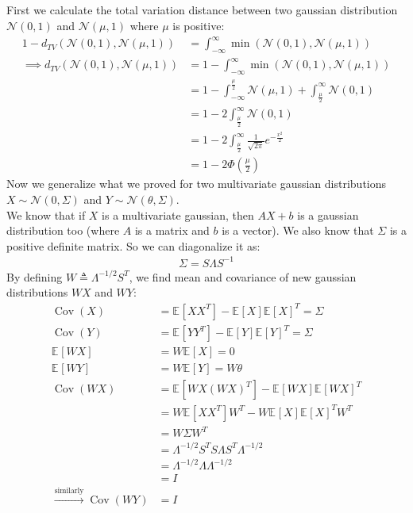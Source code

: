 \documentclass{article}
\numberwithin{equation}{section}
\newcommand{\EX}[2][]{\mathbb{E}_{#1}\left[#2\right]}%
\newcommand{\transpose}{^T}
\DeclareMathOperator*{\covariance}{Cov}
\newcommand{\Cov}[1]{\covariance\left(#1\right)}
\begin{document}
\subsection{}
First we calculate the total variation distance between two gaussian distribution \(\mathcal{N}(0, 1)\) and \(\mathcal{N}(\mu, 1)\) where \(\mu\) is positive:
\begin{align}
1 - d_{TV}(\mathcal{N}(0, 1), \mathcal{N}(\mu, 1)) &= \int_{-\infty}^{\infty} \min(\mathcal{N}(0, 1), \mathcal{N}(\mu, 1))\\
\implies d_{TV}(\mathcal{N}(0, 1), \mathcal{N}(\mu, 1)) &= 1 - \int_{-\infty}^{\infty} \min(\mathcal{N}(0, 1), \mathcal{N}(\mu, 1))\\
&= 1 - \int_{-\infty}^{\frac{\mu}{2}} \mathcal{N}(\mu, 1) + \int_{\frac{\mu}{2}}^{\infty} \mathcal{N}(0, 1)\\
&= 1 - 2 \int_{\frac{\mu}{2}}^{\infty} \mathcal{N}(0, 1)\\
&= 1 - 2 \int_{\frac{\mu}{2}}^{\infty} \frac{1}{\sqrt{2\pi}} e^{-\frac{x^2}{2}}\\
&= 1 - 2 \Phi(\frac{\mu}{2})
\end{align}
Now we generalize what we proved for two multivariate gaussian distributions \(X\sim \mathcal{N}(0, \Sigma)\) and \(Y\sim \mathcal{N}(\theta, \Sigma)\).\\
We know that if \(X\) is a multivariate gaussian, then \(AX + b\) is a gaussian distribution too (where \(A\) is a matrix and \(b\) is a vector).
We also know that \(\Sigma\) is a positive definite matrix.
So we can diagonalize it as:
\begin{align}
\Sigma = S \Lambda S^{-1}
\end{align}
By defining \(W\triangleq \Lambda^{-1/2} S\transpose\), we find mean and covariance of new gaussian distributions \(WX\) and \(WY\):
\begin{align}
\Cov{X} &= \EX{XX\transpose} - \EX{X}\EX{X}\transpose = \Sigma\\
\Cov{Y} &= \EX{YY\transpose} - \EX{Y}\EX{Y}\transpose = \Sigma\\
\EX{WX} &= W\EX{X} = 0\\
\EX{WY} &= W\EX{Y} = W\theta\\
\Cov{WX} &= \EX{WX (WX)\transpose} - \EX{WX}\EX{WX}\transpose\\
&= W\EX{XX\transpose}W\transpose - W\EX{X}\EX{X}\transpose W\transpose\\
&= W\Sigma W\transpose\\
&= \Lambda^{-1/2} S\transpose S \Lambda S\transpose \Lambda^{-1/2}\\
&= \Lambda^{-1/2} \Lambda \Lambda^{-1/2}\\
&= I\\
\xrightarrow{\text{similarly}} \Cov{WY} &= I
\end{align}
\end{document}
